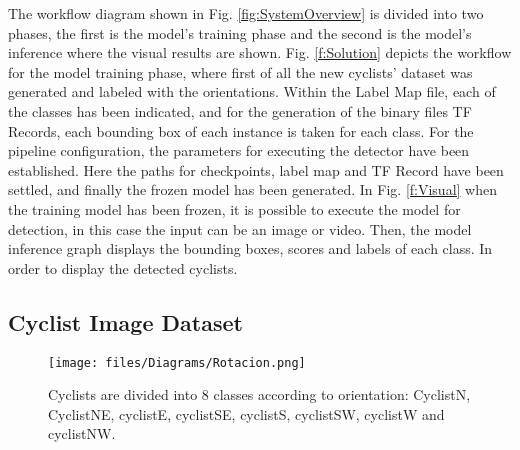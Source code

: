 \documentclass[journal]{IEEEtran}
\begin{document}
The workflow diagram shown in Fig. \ref{fig:SystemOverview} is divided into two phases, the first is the model's training phase and the second  is the model's inference where the visual results are shown. Fig. \ref{f:Solution} depicts the workflow for the model training phase, where first of all the new cyclists' dataset was generated and labeled with the orientations. Within the Label Map file, each of the classes has been indicated, and for the generation of the binary files TF Records, each bounding box of each instance is taken for each class. For the pipeline configuration, the parameters for executing the detector have been established. Here the paths for checkpoints, label map and TF Record have been settled, and finally the frozen model has been generated. In Fig. \ref{f:Visual} when the training model has been frozen, it is possible to execute the model for detection, in this case the input can be an image or video. Then, the model inference graph displays the bounding boxes, scores and labels of each class. In order to display the detected cyclists.

\subsection{Cyclist Image Dataset}
\begin{figure}[t!]
\begin{center}
  \texttt{[image: files/Diagrams/Rotacion.png]}
\caption{Cyclists are divided into 8 classes according to orientation: CyclistN, CyclistNE, cyclistE, cyclistSE, cyclistS, cyclistSW, cyclistW and cyclistNW. }
\label{fig:DiagramCyclist}       \end{center}
\end{figure}
\end{document}
